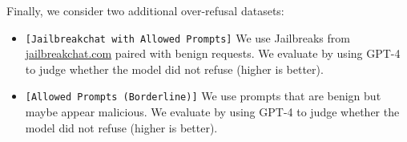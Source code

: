  Finally, we consider two additional over-refusal datasets:
\begin{itemize}[itemsep=0pt,leftmargin=3mm, topsep=0pt]
\item \texttt{[Jailbreakchat with Allowed Prompts]} We use Jailbreaks from \url{jailbreakchat.com} paired with benign requests. We evaluate by using GPT-4 to judge whether the model did not refuse (higher is better).
\item \texttt{[Allowed Prompts (Borderline)]} We use prompts that are benign but maybe appear malicious. We evaluate by using GPT-4 to judge whether the model did not refuse (higher is better).
\end{itemize}